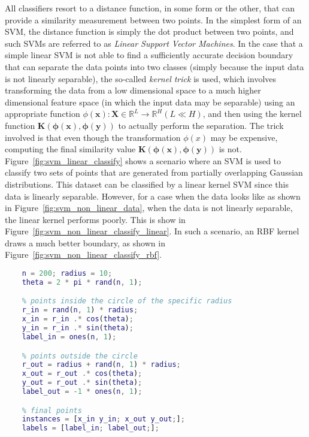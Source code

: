 All classifiers resort to a distance function, in some form or the other, that can provide a similarity measurement between two points. In the simplest form of an SVM, the distance function is simply the dot product between two points, and such SVMs are referred to as \emph{Linear Support Vector Machines}. In the case that a simple linear SVM is not able to find a sufficiently accurate decision boundary that can separate the data points into two classes (simply because the input data is not linearly separable), the so-called \emph{kernel trick} is used, which involves transforming the data from a low dimensional space to a much higher dimensional feature space (in which the input data may be separable) using an appropriate function $\phi(\mathbf{x}): \mathbf{X} \in \mathbb{R}^{L} \rightarrow \mathbb{R}^H (L \ll H)$, and then using the kernel function $\mathbf{K(\phi(x), \phi(y))}$ to actually perform the separation. The trick involved is that even though the transformation $\phi(x)$ may be expensive, computing the final similarity value $\mathbf{K(\phi(x), \phi(y))}$ is not.\\

Figure~\ref{fig:svm_linear_classify} shows a scenario where an SVM is used to classify two sets of points that are generated from partially overlapping Gaussian distributions. This dataset can be classified by a linear kernel SVM since this data is linearly separable. However, for a case when the data looks like as shown in Figure~\ref{fig:svm_non_linear_data}, when the data is not linearly separable, the linear kernel performs poorly. This is show in Figure~\ref{fig:svm_non_linear_classify_linear}. In such a scenario, an RBF kernel draws a much better boundary, as shown in Figure~\ref{fig:svm_non_linear_classify_rbf}.

\begin{lstlisting}[language=Matlab,frame=single,captionpos=b,caption={Generating the dataset to be classified by a linear classifier},label={lst:svm_linear_classify}]
    % constants
    n = 200; radius = 10;
    theta = 2 * pi * rand(n, 1);

    % points inside the circle of the specific radius
    r_in = rand(n, 1) * radius;
    x_in = r_in .* cos(theta);
    y_in = r_in .* sin(theta);
    label_in = ones(n, 1);

    % points outside the circle
    r_out = radius + rand(n, 1) * radius;
    x_out = r_out .* cos(theta);
    y_out = r_out .* sin(theta);
    label_out = -1 * ones(n, 1);

    % final points
    instances = [x_in y_in; x_out y_out;];
    labels = [label_in; label_out;];
\end{lstlisting}


